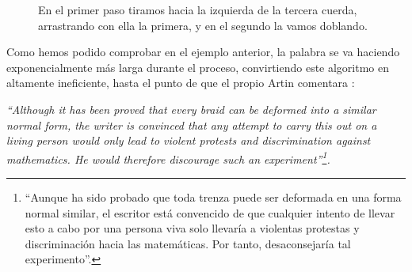 \documentclass[TFG.tex]{subfiles}
\begin{document}
\begin{ej}
\begin{figure}[h!]
\quad
{}
\caption{En el primer paso tiramos hacia la izquierda de la tercera cuerda, arrastrando con ella la primera, y en el segundo la vamos doblando.}\label{peinado}
\end{figure}

\end{ej}

Como hemos podido comprobar en el ejemplo anterior, la palabra se va haciendo exponencialmente más larga durante el proceso, convirtiendo este algoritmo en altamente ineficiente, hasta el punto de que el propio Artin comentara \cite{Artin}:

\emph{``Although it has been proved that every braid can be deformed into a similar normal form, the writer is
convinced that any attempt to carry this out on a living person would only lead to violent protests and
discrimination against mathematics. He would therefore discourage such an experiment''\footnote{``Aunque ha sido probado que toda trenza puede ser deformada en una forma normal similar, el escritor está convencido de que cualquier intento de llevar esto a cabo por una persona viva solo llevaría a violentas protestas y discriminación hacia las matemáticas. Por tanto, desaconsejaría tal experimento''.}.}
\end{document}
